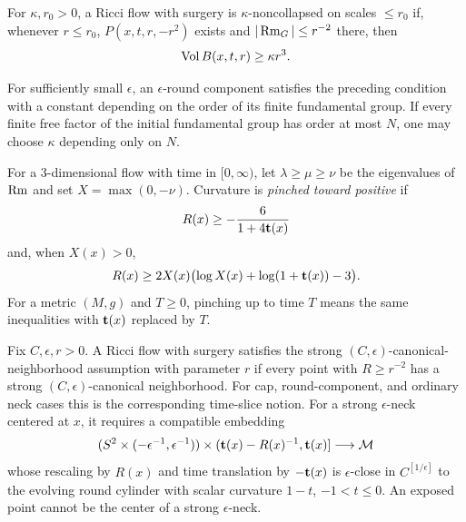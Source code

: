 \begin{definition}
\label{def:kappa-noncollapsed-surgery}

\label{defnkappa}
For $\kappa,r_0>0$, a Ricci flow with surgery is
$\kappa$-noncollapsed on scales $\leq r_0$ if, whenever $r\leq r_0$,
$P(x,t,r,-r^2)$ exists and $|\operatorname{Rm}_G|\leq r^{-2}$ there, then
\[
  \operatorname{Vol} B(x,t,r)\geq\kappa r^3.
\]
\end{definition}

\begin{remark}
\label{rem:epsilon-round-kappa-dependence}

For sufficiently small $\epsilon$, an $\epsilon$-round component satisfies the
preceding condition with a constant depending on the order of its finite
fundamental group. If every finite free factor of the initial fundamental group
has order at most $N$, one may choose $\kappa$ depending only on $N$.
\end{remark}

\begin{definition}
\label{def:curvature-pinched-toward-positive-surgery}

For a $3$-dimensional flow with time in $[0,\infty)$, let
$\lambda\geq\mu\geq\nu$ be the eigenvalues of $\operatorname{Rm}$ and set
$X=\max(0,-\nu)$. Curvature is \emph{pinched toward positive} if
\[
  R(x)\geq-\frac6{1+4{\bf t}(x)}
\]
and, when $X(x)>0$,
\[
  R(x)\geq2X(x)\bigl(\log X(x)+\log(1+{\bf t}(x))-3\bigr).
\]
For a metric $(M,g)$ and $T\geq0$, pinching up to time $T$ means the same
inequalities with ${\bf t}(x)$ replaced by $T$.
\end{definition}

\begin{definition}
\label{def:strong-canonical-neighborhood-assumption}

Fix $C,\epsilon,r>0$. A Ricci flow with surgery satisfies the strong
$(C,\epsilon)$-canonical-neighborhood assumption with parameter $r$ if every
point with $R\geq r^{-2}$ has a strong $(C,\epsilon)$-canonical neighborhood.
For cap, round-component, and ordinary neck cases this is the corresponding
time-slice notion. For a strong $\epsilon$-neck centered at $x$, it requires a
compatible embedding
\[
  (S^2\times(-\epsilon^{-1},\epsilon^{-1}))
  \times({\bf t}(x)-R(x)^{-1},{\bf t}(x)]
  \longrightarrow{\mathcal M}
\]
whose rescaling by $R(x)$ and time translation by $-{\bf t}(x)$ is
$\epsilon$-close in $C^{[1/\epsilon]}$ to the evolving round cylinder with
scalar curvature $1-t$, $-1<t\leq0$. An exposed point cannot be the center of
a strong $\epsilon$-neck.
\end{definition}
